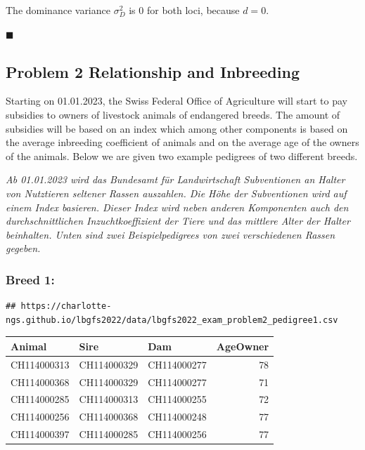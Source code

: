 \documentclass[
]{article}
\newcommand{\solend}
{\vspace{2ex}$\blacksquare$}
\begin{document}
The dominance variance \(\sigma_D^2\) is \(0\) for both loci, because
\(d=0\).

\solend

\clearpage
\pagebreak

\hypertarget{problem-2-relationship-and-inbreeding}{%
\subsection{Problem 2 Relationship and
Inbreeding}\label{problem-2-relationship-and-inbreeding}}

Starting on 01.01.2023, the Swiss Federal Office of Agriculture will
start to pay subsidies to owners of livestock animals of endangered
breeds. The amount of subsidies will be based on an index which among
other components is based on the average inbreeding coefficient of
animals and on the average age of the owners of the animals. Below we
are given two example pedigrees of two different breeds.

\textit{Ab 01.01.2023 wird das Bundesamt für Landwirtschaft Subventionen an Halter von Nutztieren seltener Rassen auszahlen. Die Höhe der Subventionen wird auf einem Index basieren. Dieser Index wird neben anderen Komponenten auch den durchschnittlichen Inzuchtkoeffizient der Tiere und das mittlere Alter der Halter beinhalten. Unten sind zwei Beispielpedigrees von zwei verschiedenen Rassen gegeben.}

\hypertarget{breed-1}{%
\subsubsection{Breed 1:}\label{breed-1}}

\begin{verbatim}
## https://charlotte-ngs.github.io/lbgfs2022/data/lbgfs2022_exam_problem2_pedigree1.csv
\end{verbatim}

\begin{longtable}[]{@{}lllr@{}}
\toprule()
Animal & Sire & Dam & AgeOwner \\
\midrule()
\endhead
CH114000313 & CH114000329 & CH114000277 & 78 \\
CH114000368 & CH114000329 & CH114000277 & 71 \\
CH114000285 & CH114000313 & CH114000255 & 72 \\
CH114000256 & CH114000368 & CH114000248 & 77 \\
CH114000397 & CH114000285 & CH114000256 & 77 \\
\bottomrule()
\end{longtable}
\end{document}
